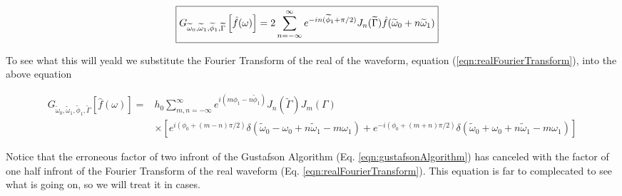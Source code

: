\documentclass[onecolumn, groupedaddress, 10pt]{revtex4-1}
\begin{document}
\begin{align}
\Aboxed{
G_{\widetilde{\omega}_0,\widetilde{\omega}_1,\widetilde{\phi}_1,\widetilde{\Gamma}} \left[ \hat{f}(\omega) \right] 
= 2\sum_{n=-\infty}^{\infty} e^{-in(\widetilde{\phi}_1+\pi/2)} J_n(\widetilde{\Gamma}) \hat{f} (\widetilde{\omega}_0 + n\widetilde{\omega}_1)
}
\end{align}

To see what this will yeald we substitute the Fourier Transform of the real of the waveform, equation (\ref{eqn:realFourierTransform}), into the above equation

\begin{align}
G_{\widetilde{\omega}_0,\widetilde{\omega}_1,\widetilde{\phi}_1,\widetilde{\Gamma}} \left[ \hat{f}(\omega) \right] = 
&h_0 \sum_{m,n=-\infty}^{\infty} e^{i(m\phi_1-n\widetilde{\phi}_1)} J_n(\widetilde{\Gamma}) J_m (\Gamma)				\nonumber \\
&\times \left[
e^{i(\phi_0 + (m-n)\pi/2)} \delta(\widetilde{\omega}_0 - \omega_0 + n\widetilde{\omega}_1 - m\omega_1)
+ e^{-i(\phi_0 + (m+n)\pi/2)} \delta(\widetilde{\omega}_0 + \omega_0 + n\widetilde{\omega}_1 - m\omega_1)
\right]
\end{align}

Notice that the erroneous factor of two infront of the Gustafson Algorithm (Eq. \ref{eqn:gustafsonAlgorithm}) has canceled with the factor of one half infront of the Fourier Transform of the real waveform (Eq. \ref{eqn:realFourierTransform}).  This equation is far to complecated to see what is going on, so we will treat it in cases.





\end{document}
